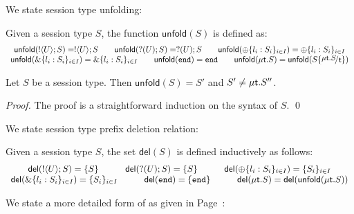 

\newcommand{\delete}[1]{\mathsf{del}(#1)}
\newcommand{\unfold}[1]{\mathsf{unfold}(#1)}
We state session type unfolding:
\begin{definition}
	Given a session type $S$, the function $\unfold{S}$ is defined as:
	\[
	\begin{array}{c}
		\unfold{\btout{U} S} = \btout{U} S
		\qquad
		\unfold{\btinp{U} S} = \btinp{U} S
		\qquad
		\unfold{\btsel{l_i: S_i}_{i \in I}} = \btsel{l_i: S_i}_{i \in I}
		\\
		\unfold{\btbra{l_i: S_i}_{i \in I}} = \btbra{l_i: S_i}_{i \in I}
		\qquad 
		\unfold{\tinact} = \tinact
		\qquad
		\unfold{\trec{t}{S}} = \unfold{S \subst{\trec{t}{S}}{\tvar{t}}  }
	\end{array}
	\]
\end{definition}

\begin{lemma}
	Let $S$ be a session type. Then $\unfold{S} = S'$ and
	$S' \not= \mu\mathsf{t}.S''$.
\end{lemma}

\begin{proof}
	The proof is a straightforward induction on the syntax of $S$. \qed
\end{proof}

We state session type prefix deletion relation:
\begin{definition}
	Given a session type $S$, the set $\delete{S}$ is defined inductively as follows:
	\[
	\begin{array}{c}
		\delete{\btout{U} S} = \set{S}
		\qquad \quad
		\delete{\btinp{U} S} = \set{S}
		\qquad \quad
		\delete{\btsel{l_i: S_i}_{i \in I}} = \set{S_i}_{i \in I}
		\\
		\delete{\btbra{l_i: S_i}_{i \in I}} = \set{S_i}_{i \in I}
		\qquad \quad
		\delete{\tinact} = \set{\tinact}
		\qquad \quad
		\delete{\trec{t}{S}} = \delete{\unfold{\trec{t}{S}}}
	\end{array}
	\]
\end{definition}

\label{app:inhabit}

We state a more detailed form of  as given in Page~\pageref{p:inhabit}:

